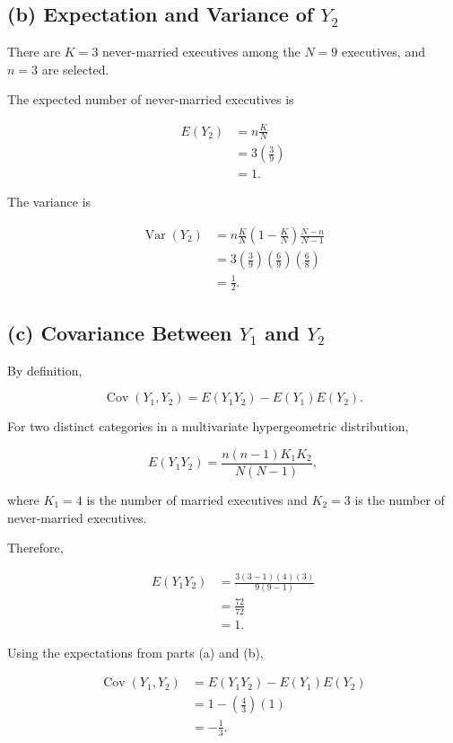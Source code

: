 \documentclass[11pt, a4paper]{article}
\begin{document}
\subsection{(b) Expectation and Variance of $Y_2$}

There are $K=3$ never-married executives among the
$N=9$ executives, and $n=3$ are selected.

The expected number of never-married executives is

\begin{align*}
E(Y_2)
&= n\frac{K}{N}\\
&= 3\left(\frac{3}{9}\right)\\
&= 1.
\end{align*}

The variance is

\begin{align*}
\operatorname{Var}(Y_2)
&= n\frac{K}{N}
\left(1-\frac{K}{N}\right)
\frac{N-n}{N-1}\\
&= 3\left(\frac{3}{9}\right)
\left(\frac{6}{9}\right)
\left(\frac{6}{8}\right)\\
&= \frac{1}{2}.
\end{align*}

\subsection{(c) Covariance Between $Y_1$ and $Y_2$}

By definition,

\[
\operatorname{Cov}(Y_1,Y_2)
= E(Y_1Y_2)-E(Y_1)E(Y_2).
\]

For two distinct categories in a multivariate
hypergeometric distribution,

\[
E(Y_1Y_2)
= \frac{n(n-1)K_1K_2}{N(N-1)},
\]

where $K_1=4$ is the number of married executives and
$K_2=3$ is the number of never-married executives.

Therefore,

\begin{align*}
E(Y_1Y_2)
&= \frac{3(3-1)(4)(3)}{9(9-1)}\\
&= \frac{72}{72}\\
&= 1.
\end{align*}

Using the expectations from parts (a) and (b),

\begin{align*}
\operatorname{Cov}(Y_1,Y_2)
&= E(Y_1Y_2)-E(Y_1)E(Y_2)\\
&= 1-\left(\frac{4}{3}\right)(1)\\
&= -\frac{1}{3}.
\end{align*}
\end{document}
